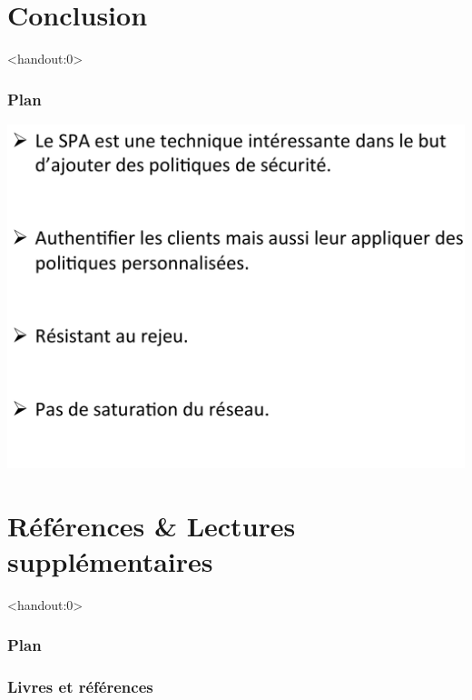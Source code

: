 \section{Conclusion}

\begin{frame}<handout:0>
  \frametitle{Plan}
  \tableofcontents[currentsection,subsectionstyle=hide]
\end{frame}

\begin{frame}
\centerline{\includegraphics[scale=0.35]{conclu}}
\end{frame}

\section{Références \& Lectures supplémentaires}

\begin{frame}<handout:0>
  \frametitle{Plan}
  \tableofcontents[currentsection,subsectionstyle=hide]
\end{frame}

\nocite{*}


\begin{frame}[allowframebreaks]
  \frametitle{Livres et références}
  
\end{frame}

\begin{frame}
  \vfill
  \centering
  \vfill
\end{frame}
